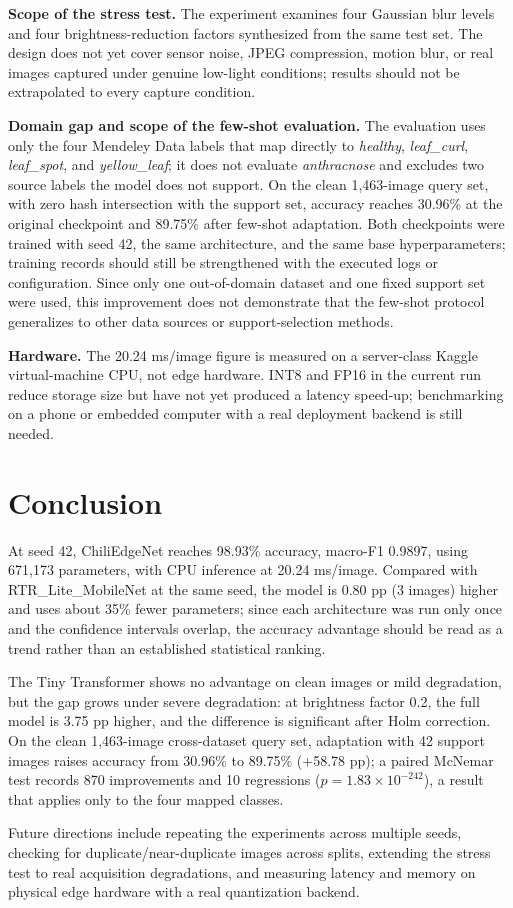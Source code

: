 \textbf{Scope of the stress test.} The experiment examines four Gaussian blur levels and four brightness-reduction factors synthesized from the same test set. The design does not yet cover sensor noise, JPEG compression, motion blur, or real images captured under genuine low-light conditions; results should not be extrapolated to every capture condition.

\textbf{Domain gap and scope of the few-shot evaluation.} The evaluation uses only the four Mendeley Data labels that map directly to \emph{healthy}, \emph{leaf\_curl}, \emph{leaf\_spot}, and \emph{yellow\_leaf}; it does not evaluate \emph{anthracnose} and excludes two source labels the model does not support. On the clean 1,463-image query set, with zero hash intersection with the support set, accuracy reaches 30.96\% at the original checkpoint and 89.75\% after few-shot adaptation. Both checkpoints were trained with seed 42, the same architecture, and the same base hyperparameters; training records should still be strengthened with the executed logs or configuration. Since only one out-of-domain dataset and one fixed support set were used, this improvement does not demonstrate that the few-shot protocol generalizes to other data sources or support-selection methods.

\textbf{Hardware.} The 20.24 ms/image figure is measured on a server-class Kaggle virtual-machine CPU, not edge hardware. INT8 and FP16 in the current run reduce storage size but have not yet produced a latency speed-up; benchmarking on a phone or embedded computer with a real deployment backend is still needed.

\FloatBarrier

\section{Conclusion}\label{conclusion}

At seed 42, ChiliEdgeNet reaches 98.93\% accuracy, macro-F1 0.9897, using 671,173 parameters, with CPU inference at 20.24 ms/image. Compared with RTR\_Lite\_MobileNet \cite{duhan2025} at the same seed, the model is 0.80 pp (3 images) higher and uses about 35\% fewer parameters; since each architecture was run only once and the confidence intervals overlap, the accuracy advantage should be read as a trend rather than an established statistical ranking.

The Tiny Transformer shows no advantage on clean images or mild degradation, but the gap grows under severe degradation: at brightness factor 0.2, the full model is 3.75 pp higher, and the difference is significant after Holm correction. On the clean 1,463-image cross-dataset query set, adaptation with 42 support images raises accuracy from 30.96\% to 89.75\% (+58.78 pp); a paired McNemar test records 870 improvements and 10 regressions ($p = 1.83 \times 10^{-242}$), a result that applies only to the four mapped classes.

Future directions include repeating the experiments across multiple seeds, checking for duplicate/near-duplicate images across splits, extending the stress test to real acquisition degradations, and measuring latency and memory on physical edge hardware with a real quantization backend.


